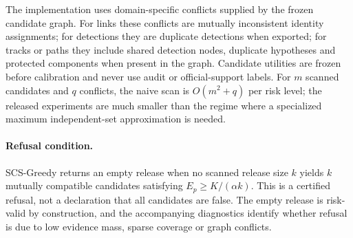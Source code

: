 \documentclass[11pt]{article}
\begin{document}
The implementation uses domain-specific conflicts supplied by the frozen candidate graph.
For links these conflicts are mutually inconsistent identity assignments; for detections they are duplicate detections when exported; for tracks or paths they include shared detection nodes, duplicate hypotheses and protected components when present in the graph.
Candidate utilities are frozen before calibration and never use audit or official-support labels.
For \(m\) scanned candidates and \(q\) conflicts, the naive scan is \(O(m^2+q)\) per risk level; the released experiments are much smaller than the regime where a specialized maximum independent-set approximation is needed.

\begin{table}[h]
\centering
\caption{Compatibility predicate used by SCS-Greedy.}
\small
{}
\end{table}

\paragraph{Refusal condition.}
SCS-Greedy returns an empty release when no scanned release size \(k\) yields \(k\) mutually compatible candidates satisfying \(E_p\ge K/(\alpha k)\).
This is a certified refusal, not a declaration that all candidates are false.
The empty release is risk-valid by construction, and the accompanying diagnostics identify whether refusal is due to low evidence mass, sparse coverage or graph conflicts.
\end{document}
